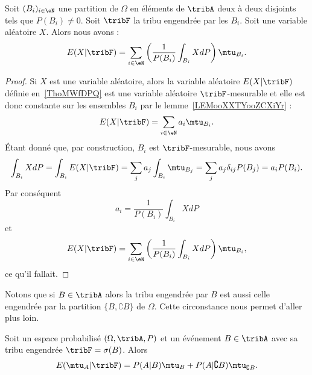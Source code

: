 \begin{proposition}
	Soit \( (B_i)_{i\in\eN}\) une partition de \( \Omega\) en éléments de \( \tribA\) deux à deux disjoints tels que \( P(B_i)\neq 0\). Soit \( \tribF\) la tribu engendrée par les \( B_i\). Soit une variable aléatoire \( X\). Alors nous avons :
	\begin{equation}    \label{EqCibwoG}
		E(X|\tribF)=\sum_{i\in \eN}\left( \frac{1}{ P(B_i) }\int_{B_i}XdP \right)\mtu_{B_i}.
	\end{equation}
\end{proposition}

\begin{proof}
	Si \( X\) est une variable aléatoire, alors la variable aléatoire \( E(X|\tribF)\) définie en~\ref{ThoMWfDPQ} est une variable aléatoire \( \tribF\)-mesurable et elle est donc constante sur les ensembles \( B_i\) par le lemme~\ref{LEMooXXTYooZCXiYr} :
	\begin{equation}
		E(X|\tribF)=\sum_{i\in\eN}a_i\mtu_{B_i}.
	\end{equation}
	Étant donné que, par construction, \( B_i\) est \( \tribF\)-mesurable, nous avons
	\begin{equation}
		\int_{B_i}XdP=\int_{B_i}E(X|\tribF)
		=\sum_ja_j\int_{B_i}\mtu_{B_j}
		=\sum_ja_j\delta_{ij}P(B_j)
		=a_iP(B_i).
	\end{equation}
	Par conséquent
	\begin{equation}
		a_i=\frac{1}{ P(B_i) }\int_{B_i}XdP
	\end{equation}
	et
	\begin{equation}
		E(X|\tribF)=\sum_{i\in \eN}\left( \frac{1}{ P(B_i) }\int_{B_i}XdP \right)\mtu_{B_i},
	\end{equation}
	ce qu'il fallait.
\end{proof}

Notons que si \( B\in\tribA\) alors la tribu engendrée par \( B\) est aussi celle engendrée par la partition \( \{ B,\complement B \}\) de \( \Omega\). Cette circonstance nous permet d'aller plus loin.

\begin{proposition}
	Soit un espace probabilisé \( (\Omega,\tribA,P)\) et un événement \( B\in\tribA\) avec sa tribu engendrée \( \tribF=\sigma(B)\). Alors
	\begin{equation}
		E(\mtu_A|\tribF)=P(A|B)\mtu_B+P(A|\complement B)\mtu_{\complement B}.
	\end{equation}
\end{proposition}

